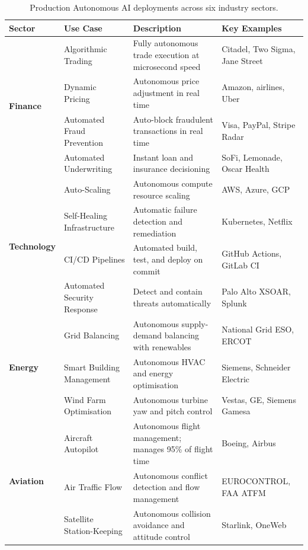 \documentclass[12pt, a4paper]{article}
\begin{document}
\begin{table}[ht]
\centering
\caption{Production Autonomous AI deployments across six industry sectors.}
\label{tab:usecases}
\begin{tabular}{llp{5cm}p{4cm}}
\toprule
\textbf{Sector} & \textbf{Use Case} & \textbf{Description} & \textbf{Key Examples} \\
\midrule
\multirow{4}{*}{\textbf{Finance}}
  & Algorithmic Trading        & Fully autonomous trade execution at microsecond speed & Citadel, Two Sigma, Jane Street \\
  & Dynamic Pricing            & Autonomous price adjustment in real time               & Amazon, airlines, Uber \\
  & Automated Fraud Prevention & Auto-block fraudulent transactions in real time        & Visa, PayPal, Stripe Radar \\
  & Automated Underwriting     & Instant loan and insurance decisioning                 & SoFi, Lemonade, Oscar Health \\
\midrule
\multirow{4}{*}{\textbf{Technology}}
  & Auto-Scaling               & Autonomous compute resource scaling                   & AWS, Azure, GCP \\
  & Self-Healing Infrastructure & Automatic failure detection and remediation          & Kubernetes, Netflix \\
  & CI/CD Pipelines            & Automated build, test, and deploy on commit           & GitHub Actions, GitLab CI \\
  & Automated Security Response & Detect and contain threats automatically             & Palo Alto XSOAR, Splunk \\
\midrule
\multirow{3}{*}{\textbf{Energy}}
  & Grid Balancing             & Autonomous supply-demand balancing with renewables    & National Grid ESO, ERCOT \\
  & Smart Building Management  & Autonomous HVAC and energy optimisation               & Siemens, Schneider Electric \\
  & Wind Farm Optimisation     & Autonomous turbine yaw and pitch control              & Vestas, GE, Siemens Gamesa \\
\midrule
\multirow{3}{*}{\textbf{Aviation}}
  & Aircraft Autopilot         & Autonomous flight management; manages 95\% of flight time & Boeing, Airbus \\
  & Air Traffic Flow           & Autonomous conflict detection and flow management     & EUROCONTROL, FAA ATFM \\
  & Satellite Station-Keeping  & Autonomous collision avoidance and attitude control   & Starlink, OneWeb \\

\end{tabular}
\end{table}
\end{document}
